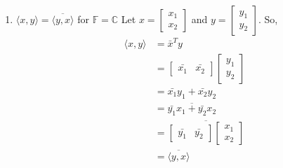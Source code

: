 \documentclass[a4paper]{article}
\begin{document}
\begin{qalist}
\begin{enumerate}[label=\alph*., align=left]
			\item $\langle x,y \rangle = \overline{\langle y,x \rangle}$ for $\mathbb{F} = \mathbb{C}$
				Let $x = \begin{bmatrix}{x}_{1} \\ {x}_{2}\end{bmatrix}$ and $y = \begin{bmatrix}{y}_{1} \\ {y}_{2}\end{bmatrix}$. So,
				\begin{align}
					\langle x,y \rangle &= {\bar{x}}^{T}y \\
					&= \begin{bmatrix}\bar{{x}_{1}} & \bar{{x}_{2}}\end{bmatrix} \begin{bmatrix}{y}_{1} \\ {y}_{2}\end{bmatrix} \\
					&= \bar{{x}_{1}}{y}_{1} + \bar{{x}_{2}}{y}_{2} \\
					&= \overline{\bar{{y}_{1}}{x}_{1} + \bar{{y}_{2}}{x}_{2}} \\
					&= \overline{\begin{bmatrix}\bar{{y}_{1}} & \bar{{y}_{2}}\end{bmatrix} \begin{bmatrix}{x}_{1} \\ {x}_{2}\end{bmatrix}} \\
					&= \overline{\langle y,x \rangle}
				\end{align}
				

\end{enumerate}
\end{qalist}
\end{document}
